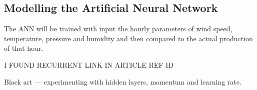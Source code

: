 \subsection{Modelling the Artificial Neural Network}
The ANN will be trained with input the hourly parameters of wind speed, temperature, pressure and humidity and then compared to the actual production of that hour.

I FOUND RECURRENT LINK IN ARTICLE REF ID

Black art --- experimenting with hidden layers, momentum and learning rate. 